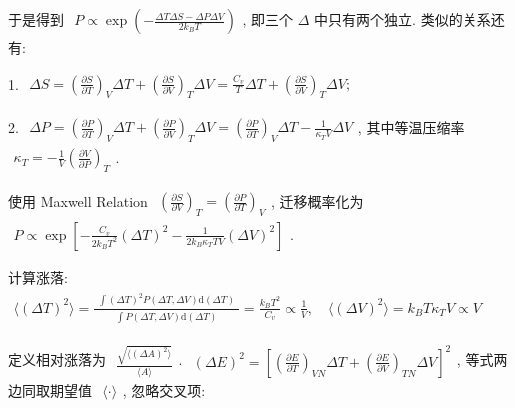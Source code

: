 \documentclass[../../main.tex]{subfiles}
\begin{document}
于是得到 $\begin{aligned}
    P\propto \exp{\left(-\frac{\Delta T\Delta S-\Delta P\Delta V}{2k_{B}T}\right)}
\end{aligned}$, 即三个 $\Delta$ 中只有两个独立. 类似的关系还有: 

1. $\begin{aligned}
    \Delta S = \left(\frac{\partial S}{\partial T}\right)_{V}\Delta T + \left(\frac{\partial S}{\partial V}\right)_{T}\Delta V = \frac{C_{v}}{T}\Delta T + \left(\frac{\partial S}{\partial V}\right)_{T}\Delta V;
\end{aligned}$

2. $\begin{aligned}
    \Delta P = \left(\frac{\partial P}{\partial T}\right)_{V}\Delta T + \left(\frac{\partial P}{\partial V}\right)_{T}\Delta V = \left(\frac{\partial P}{\partial T}\right)_{V}\Delta T - \frac{1}{\kappa_{T}V}\Delta V
\end{aligned}$, 其中等温压缩率 $\begin{aligned}
    \kappa_{T} = -\frac{1}{V}\left(\frac{\partial V}{\partial P}\right)_{T}
\end{aligned}$.

使用 Maxwell Relation $\begin{aligned}
    \left(\frac{\partial S}{\partial V}\right)_{T} = \left(\frac{\partial P}{\partial T}\right)_{V}
\end{aligned}$, 迁移概率化为 $\begin{aligned}
    P\propto \exp{\left[
        -\frac{C_{v}}{2k_{B}T^{2}}(\Delta T)^{2} - \frac{1}{2k_{B}\kappa_{T}TV}\left(\Delta V\right)^{2}
    \right]}
\end{aligned}$. 

计算涨落: $\begin{aligned}
    \langle (\Delta T)^{2}\rangle = \frac{\begin{aligned}
        \int (\Delta T)^{2}P(\Delta T,\Delta V)\mathrm{d}(\Delta T)
    \end{aligned}}{\begin{aligned}
        \int P(\Delta T,\Delta V)\mathrm{d}(\Delta T)
    \end{aligned}} = \frac{k_{B}T^{2}}{C_{v}}\propto \frac{1}{V},\quad \langle (\Delta V)^{2}\rangle = k_{B}T\kappa_{T}V\propto V
\end{aligned}$

定义相对涨落为 $\begin{aligned}
    \frac{\sqrt{\langle(\Delta A)^{2}\rangle}}{\langle A\rangle}
\end{aligned}$. $\begin{aligned}
    (\Delta E)^{2} = \left[\left(\frac{\partial E}{\partial T}\right)_{VN}\Delta T + \left(\frac{\partial E}{\partial V}\right)_{TN}\Delta V\right]^{2}
\end{aligned}$, 等式两边同取期望值 $\begin{aligned}
    \langle\cdot\rangle
\end{aligned}$, 忽略交叉项: 
\end{document}
